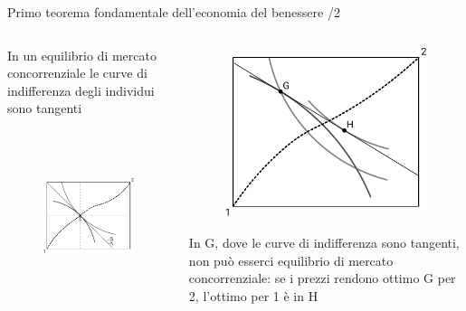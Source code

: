 \documentclass[aspectratio=149,11pt]{beamer}
\begin{document}
\begin{frame}{Primo teorema fondamentale dell’economia del benessere /2}
\begin{columns}
\begin{column}{.5\columnwidth}
In un equilibrio di mercato concorrenziale le curve di indifferenza degli individui sono tangenti

\begin{figure}[htbp]
\centering
\includegraphics[height=5cm]{./figure/edgeworth-4.pdf}
\end{figure}
\end{column}

\begin{column}{.5\columnwidth}
\begin{figure}[htbp]
\centering
\includegraphics[height=5cm]{./figure/edgeworth-5.pdf}
\end{figure}
\small
In G, dove le curve di indifferenza sono tangenti, non può esserci equilibrio di mercato concorrenziale: se i prezzi rendono ottimo G per 2, l’ottimo per 1 è in H
\end{column}
\end{columns}
\end{frame}
\end{document}
